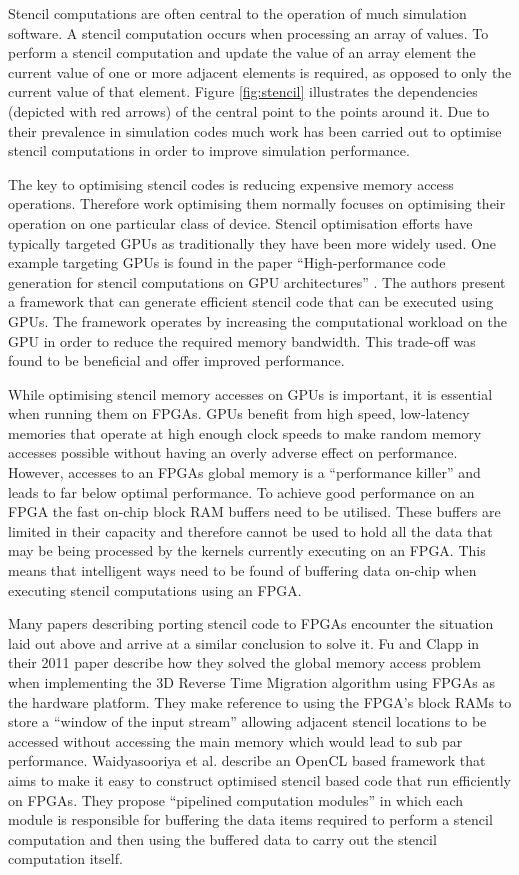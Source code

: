 \documentclass{mpaper}
\begin{document}
Stencil computations are often central to the operation of much simulation software. 
A stencil computation occurs when processing an array of values.
To perform a stencil computation and update the value of an array element the current value of one or more adjacent elements is required, as opposed to only the current value of that element.
Figure \ref{fig:stencil} illustrates the dependencies (depicted with red arrows) of the central point to the points around it. 
Due to their prevalence in simulation codes much work has been carried out to optimise stencil computations in order to improve simulation performance. 

The key to optimising stencil codes is reducing expensive memory access operations. 
Therefore work optimising them normally focuses on optimising their operation on one particular class of device. 
Stencil optimisation efforts have typically targeted GPUs as traditionally they have been more widely used.
One example targeting GPUs is found in the paper ``High-performance code generation for stencil computations on GPU architectures'' \cite{Holewinski2012}.
The authors present a framework that can generate efficient stencil code that can be executed using GPUs. 
The framework operates by increasing the computational workload on the GPU in order to reduce the required memory bandwidth.
This trade-off was found to be beneficial and offer improved performance. 

While optimising stencil memory accesses on GPUs is important, it is essential when running them on FPGAs.
GPUs benefit from high speed, low-latency memories that operate at high enough clock speeds to make random memory accesses possible without having an overly adverse effect on performance. 
However, accesses to an FPGAs global memory is a ``performance killer'' and leads to far below optimal performance.
To achieve good performance on an FPGA the fast on-chip block RAM buffers need to be utilised. 
These buffers are limited in their capacity and therefore cannot be used to hold all the data that may be being processed by the kernels currently executing on an FPGA. 
This means that intelligent ways need to be found of buffering data on-chip when executing stencil computations using an FPGA.

Many papers describing porting stencil code to FPGAs encounter the situation laid out above and arrive at a similar conclusion to solve it.
Fu and Clapp in their 2011 paper \cite{Fu2011} describe how they solved the global memory access problem when implementing the 3D Reverse Time Migration algorithm using FPGAs as the hardware platform.
They make reference to using the FPGA's block RAMs to store a ``window of the input stream'' allowing adjacent stencil locations to be accessed without accessing the main memory which would lead to sub par performance.
Waidyasooriya et al. \cite{Waidyasooriya2017} describe an OpenCL based framework that aims to make it easy to construct optimised stencil based code that run efficiently on FPGAs.
They propose ``pipelined computation modules'' in which each module is responsible for buffering the data items required to perform a stencil computation and then using the buffered data to carry out the stencil computation itself.
\end{document}
